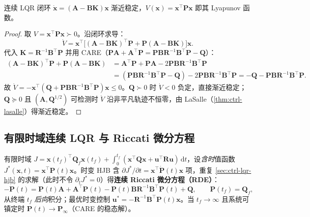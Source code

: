 \begin{theorem}
\label{thm:ctrl-lqr-lyap}
连续 LQR 闭环 $\dot{\mathbf{x}}=(\mathbf{A}-\mathbf{B}\mathbf{K})\mathbf{x}$ 渐近稳定，$V(\mathbf{x})=\mathbf{x}^\top\mathbf{P}\mathbf{x}$ 即其 Lyapunov 函数。
\end{theorem}
\begin{proof}
取 $V=\mathbf{x}^\top\mathbf{P}\mathbf{x}\succ0$。沿闭环求导：
\[
  \dot V=\mathbf{x}^\top\big[(\mathbf{A}-\mathbf{B}\mathbf{K})^\top\mathbf{P}+\mathbf{P}(\mathbf{A}-\mathbf{B}\mathbf{K})\big]\mathbf{x}.
\]
代入 $\mathbf{K}=\mathbf{R}^{-1}\mathbf{B}^\top\mathbf{P}$ 并用 CARE（$\mathbf{P}\mathbf{A}+\mathbf{A}^\top\mathbf{P}=\mathbf{P}\mathbf{B}\mathbf{R}^{-1}\mathbf{B}^\top\mathbf{P}-\mathbf{Q}$）：
\begin{align*}
  (\mathbf{A}-\mathbf{B}\mathbf{K})^\top\mathbf{P}+\mathbf{P}(\mathbf{A}-\mathbf{B}\mathbf{K})
  &=\mathbf{A}^\top\mathbf{P}+\mathbf{P}\mathbf{A}-2\mathbf{P}\mathbf{B}\mathbf{R}^{-1}\mathbf{B}^\top\mathbf{P}\\
  &=(\mathbf{P}\mathbf{B}\mathbf{R}^{-1}\mathbf{B}^\top\mathbf{P}-\mathbf{Q})-2\mathbf{P}\mathbf{B}\mathbf{R}^{-1}\mathbf{B}^\top\mathbf{P}=-\mathbf{Q}-\mathbf{P}\mathbf{B}\mathbf{R}^{-1}\mathbf{B}^\top\mathbf{P}.
\end{align*}
故 $\dot V=-\mathbf{x}^\top(\mathbf{Q}+\mathbf{P}\mathbf{B}\mathbf{R}^{-1}\mathbf{B}^\top\mathbf{P})\mathbf{x}\le0$。$\mathbf{Q}\succ0$ 时 $\dot V<0$ 负定，直接渐近稳定；$\mathbf{Q}\succeq0$ 且 $(\mathbf{A},\mathbf{Q}^{1/2})$ 可检测时 $\dot V$ 沿非平凡轨迹不恒零，由 LaSalle（\cref{thm:ctrl-lasalle}）得渐近稳定。
\end{proof}

\subsection{有限时域连续 LQR 与 Riccati 微分方程}
\label{sec:ctrl-lqr-rde}

有限时域 $J=\mathbf{x}(t_f)^\top\mathbf{Q}_f\mathbf{x}(t_f)+\int_0^{t_f}(\mathbf{x}^\top\mathbf{Q}\mathbf{x}+\mathbf{u}^\top\mathbf{R}\mathbf{u})\,\mathrm dt$，设\emph{含时}值函数 $J^*(\mathbf{x},t)=\mathbf{x}^\top\mathbf{P}(t)\mathbf{x}$。时变 HJB 含 $\partial J^*/\partial t=\mathbf{x}^\top\dot{\mathbf{P}}(t)\mathbf{x}$ 项，重复 \cref{sec:ctrl-lqr-hjb} 的求解（此时不令 $\partial_tJ^*=0$）得\textbf{连续 Riccati 微分方程（RDE）}\cite{tedrake_underactuated}：
\begin{equation}
  \boxed{-\dot{\mathbf{P}}(t)=\mathbf{P}(t)\mathbf{A}+\mathbf{A}^\top\mathbf{P}(t)-\mathbf{P}(t)\mathbf{B}\mathbf{R}^{-1}\mathbf{B}^\top\mathbf{P}(t)+\mathbf{Q},\qquad\mathbf{P}(t_f)=\mathbf{Q}_f,}
  \label{eq:ctrl-rde}
\end{equation}
从终端 $t_f$ \emph{后向}积分；最优时变控制 $\mathbf{u}^*=-\mathbf{R}^{-1}\mathbf{B}^\top\mathbf{P}(t)\mathbf{x}$。当 $t_f\to\infty$ 且系统可镇定时 $\mathbf{P}(t)\to\mathbf{P}_\infty$（CARE 的稳态解）。

